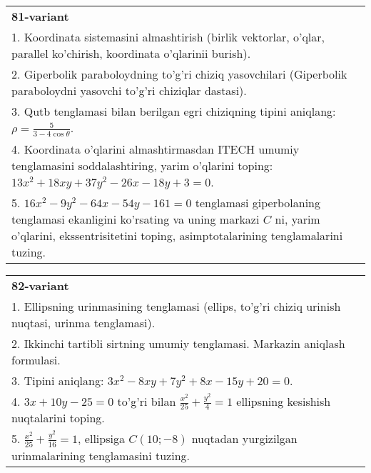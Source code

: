 \documentclass{article}
\begin{document}
\begin{tabular}{m{17cm}}
\textbf{81-variant}\\
1. Koordinata sistemasini almashtirish (birlik vektorlar, o'qlar, parallel ko'chirish, koordinata o'qlarinii burish).\\

2. Giperbolik paraboloydning to'g'ri chiziq yasovchilari (Giperbolik paraboloydni yasovchi to'g'ri chiziqlar dastasi).\\

3. Qutb tenglamasi bilan berilgan egri chiziqning tipini aniqlang: $\rho=\frac{5}{3-4\cos\theta}$.\\

4. Koordinata o'qlarini almashtirmasdan ITECH umumiy tenglamasini soddalashtiring, yarim o'qlarini toping: $13x^{2} + 18xy + 37y^{2} - 26x - 18y + 3 = 0$.  \\

5. $16x^{2} - 9y^{2} - 64x - 54y - 161 = 0$ tenglamasi giperbolaning tenglamasi ekanligini ko'rsating va uning markazi $C$ ni, yarim o'qlarini, ekssentrisitetini toping, asimptotalarining tenglamalarini tuzing.  
\end{tabular}
\vspace{1cm}


\begin{tabular}{m{17cm}}
\textbf{82-variant}\\
1. Ellipsning urinmasining tenglamasi (ellips, to'g'ri chiziq urinish nuqtasi, urinma tenglamasi).\\

2. Ikkinchi tartibli sirtning umumiy tenglamasi. Markazin aniqlash formulasi.\\

3. Tipini aniqlang: $3x^{2}-8xy+7y^{2}+8x-15y+20=0$.\\

4. $3x + 10y - 25 = 0$ to'g'ri bilan $\frac{x^{2}}{25} + \frac{y^{2}}{4} = 1$ ellipsning kesishish nuqtalarini toping.  \\

5. $\frac{x^{2}}{25} + \frac{y^{2}}{16} = 1$, ellipsiga $C(10; - 8)$ nuqtadan yurgizilgan urinmalarining tenglamasini tuzing.  
\end{tabular}
\vspace{1cm}
\end{document}
